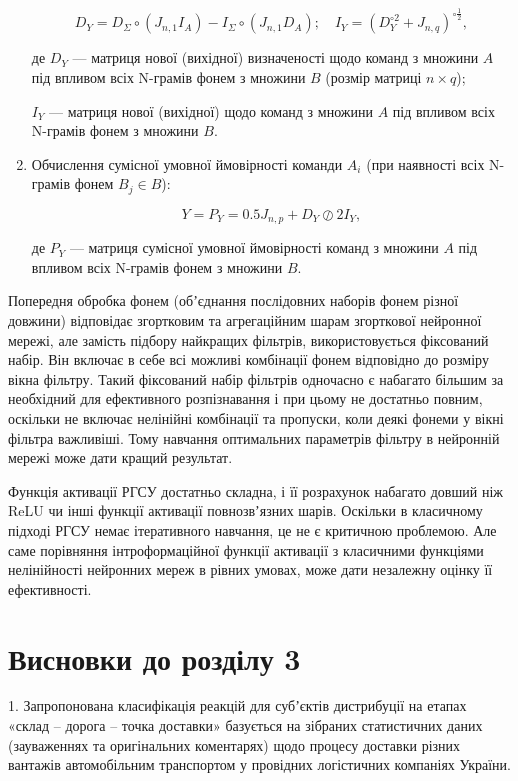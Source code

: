 \begin{enumerate}
	\[
	D_Y=D_\Sigma \circ (J_{n,1}I_A) - I_\Sigma \circ (J_{n,1}D_A);\quad I_Y=(D_Y^{\circ 2}+J_{n,q})^{\circ \frac{1}{2}},
	\]
	
	де $D_Y$ --- матриця нової (вихідної) визначеності щодо команд  з множини $A$ під впливом всіх N-грамів фонем з множини $B$ (розмір матриці $n\times q$); 
	
	$I_Y$ --- матриця нової (вихідної) щодо команд з множини $A$ під впливом всіх N-грамів фонем з множини $B$.
	
	\item Обчислення сумісної умовної ймовірності команди $A_i$ (при наявності всіх N-грамів фонем $B_j \in B$):
	
	\[
	Y=P_Y=0.5J_{n,p}+D_Y \oslash 2I_Y,
	\]
	
	де $P_Y$ --- матриця сумісної умовної ймовірності команд з множини $A$ під впливом всіх N-грамів фонем з множини $B$.
\end{enumerate}

Попередня обробка фонем (обʼєднання послідовних наборів фонем різної довжини) відповідає згортковим та агрегаційним шарам згорткової нейронної мережі, але замість підбору найкращих фільтрів, використовується фіксований набір. Він включає в себе всі можливі комбінації фонем відповідно до розміру вікна фільтру. Такий фіксований набір фільтрів одночасно є набагато більшим за необхідний для ефективного розпізнавання і при цьому не достатньо повним, оскільки не включає нелінійні комбінації та пропуски, коли деякі фонеми у вікні фільтра важливіші. Тому навчання оптимальних параметрів фільтру в нейронній мережі може дати кращий результат.

Функція активації РГСУ достатньо складна, і її розрахунок набагато довший ніж ReLU чи інші функції активації  повнозвʼязних шарів. Оскільки в класичному підході РГСУ немає ітеративного навчання, це не є критичною проблемою. Але саме порівняння інтроформаційної функції активації з класичними функціями нелінійності нейронних мереж в рівних умовах, може дати незалежну оцінку її ефективності. 

\section*{Висновки до розділу 3}

1. Запропонована класифікація реакцій для субʼєктів дистрибуції на етапах «склад – дорога – точка доставки» базується на зібраних статистичних даних (зауваженнях та оригінальних коментарях) щодо процесу доставки різних вантажів автомобільним транспортом у провідних логістичних компаніях України.


